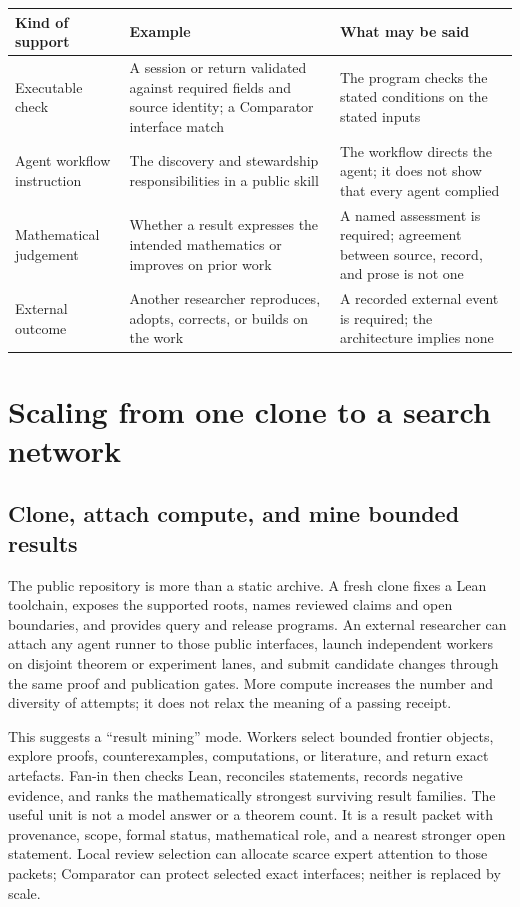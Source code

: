 \documentclass[10pt]{article}
\begin{document}
\begin{center}
\small
\begin{tabular}{p{3.1cm}p{5.2cm}p{5.2cm}}
\toprule
Kind of support & Example & What may be said \\
\midrule
Executable check & A session or return validated against required fields and source identity; a Comparator interface match & The program checks the stated conditions on the stated inputs \\
Agent workflow instruction & The discovery and stewardship responsibilities in a public skill & The workflow directs the agent; it does not show that every agent complied \\
Mathematical judgement & Whether a result expresses the intended mathematics or improves on prior work & A named assessment is required; agreement between source, record, and prose is not one \\
External outcome & Another researcher reproduces, adopts, corrects, or builds on the work & A recorded external event is required; the architecture implies none \\
\bottomrule
\end{tabular}
\end{center}

\section{Scaling from one clone to a search network}\label{sec:scaling}

\subsection{Clone, attach compute, and mine bounded results}

The public repository is more than a static archive. A fresh clone fixes a
Lean toolchain, exposes the supported roots, names reviewed claims and open
boundaries, and provides query and release programs. An external researcher
can attach any agent runner to those public interfaces, launch independent
workers on disjoint theorem or experiment lanes, and submit candidate changes
through the same proof and publication gates. More compute increases the
number and diversity of attempts; it does not relax the meaning of a passing
receipt.

This suggests a ``result mining'' mode. Workers select bounded frontier
objects, explore proofs, counterexamples, computations, or literature, and
return exact artefacts. Fan-in then checks Lean, reconciles statements, records
negative evidence, and ranks the mathematically strongest surviving result
families. The useful unit is not a model answer or a theorem count. It is a
result packet with provenance, scope, formal status, mathematical role, and a
nearest stronger open statement. Local review selection can allocate scarce
expert attention to those packets; Comparator can protect selected exact
interfaces; neither is replaced by scale.
\end{document}
